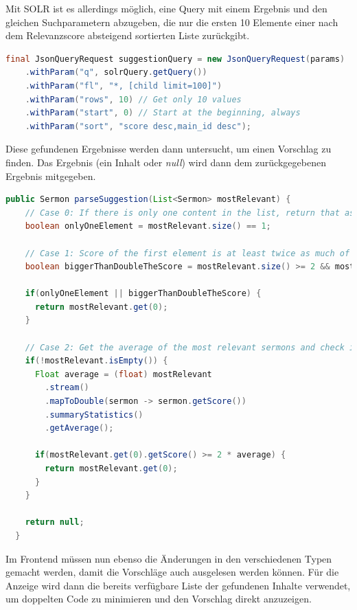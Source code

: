 Mit SOLR ist es allerdings möglich, eine Query mit einem Ergebnis und den gleichen Suchparametern abzugeben, die nur die ersten 10 Elemente einer nach dem Relevanzscore absteigend sortierten Liste zurückgibt.

\clearpage
\begin{lstlisting}[language=Java, label={code:SOLRSuggestionQuery}, title={SOLR Query für die Top 10 Ergebnisse, absteigend sortiert nach Relevanz \cite{solr-search2022}}]
  final JsonQueryRequest suggestionQuery = new JsonQueryRequest(params)
    .withParam("q", solrQuery.getQuery())
    .withParam("fl", "*, [child limit=100]")
    .withParam("rows", 10) // Get only 10 values
    .withParam("start", 0) // Start at the beginning, always
    .withParam("sort", "score desc,main_id desc");
\end{lstlisting}

Diese gefundenen Ergebnisse werden dann untersucht, um einen Vorschlag zu finden. Das Ergebnis (ein Inhalt oder \emph{null}) wird dann dem zurückgegebenen Ergebnis mitgegeben.

\begin{lstlisting}[language=Java, label={code:parseSuggestion}, title={Relevanteste Inhalte nach einem Vorschlag durchsuchen \cite{solr-search2022}}]
  public Sermon parseSuggestion(List<Sermon> mostRelevant) {
    // Case 0: If there is only one content in the list, return that as suggestion
    boolean onlyOneElement = mostRelevant.size() == 1;

    // Case 1: Score of the first element is at least twice as much of the second score
    boolean biggerThanDoubleTheScore = mostRelevant.size() >= 2 && mostRelevant.get(0).getScore() >= 2 * mostRelevant.get(1).getScore();

    if(onlyOneElement || biggerThanDoubleTheScore) {
      return mostRelevant.get(0);
    }

    // Case 2: Get the average of the most relevant sermons and check if the first has at least twice as much of that
    if(!mostRelevant.isEmpty()) {
      Float average = (float) mostRelevant
        .stream()
        .mapToDouble(sermon -> sermon.getScore())
        .summaryStatistics()
        .getAverage();

      if(mostRelevant.get(0).getScore() >= 2 * average) {
        return mostRelevant.get(0);
      }
    }

    return null;
  }
\end{lstlisting}


\clearpage
Im Frontend müssen nun ebenso die Änderungen in den verschiedenen Typen gemacht werden, damit die Vorschläge auch ausgelesen werden können.
Für die Anzeige wird dann die bereits verfügbare Liste der gefundenen Inhalte verwendet, um doppelten Code zu minimieren und den Vorschlag direkt anzuzeigen.


